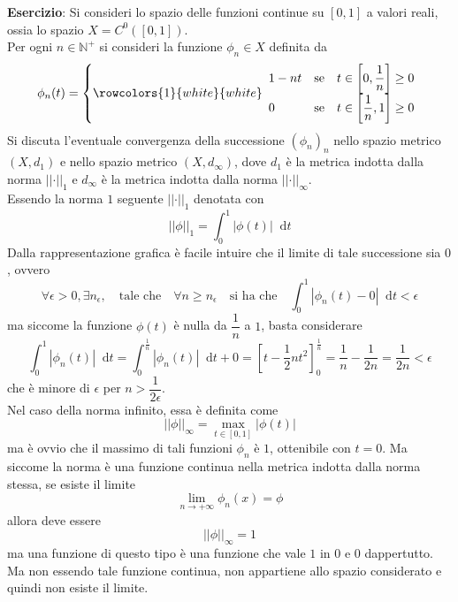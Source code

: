 \documentclass[a4paper]{extarticle}
\newcommand*\dif{\mathop{}\!\mathrm{d}}
\begin{document}
\vspace{2em}
\noindent
\textbf{Esercizio}: Si consideri lo spazio delle funzioni continue su $[0,1]$ a valori reali, ossia lo spazio $X=C^0([0,1])$.\\
Per ogni $n \in \mathbb{N}^+$ si consideri la funzione $\phi_n \in X$ definita da
\[
    \phi_n(t) = \left\{\rowcolors{1}{white}{white}    
    \begin{array}{lll}
        1-nt & \text{se} & t \in \left[0,\dfrac{1}{n}\right] \geq 0\\
        0   & \text{se} & t \in \left[\dfrac{1}{n},1\right] \geq 0\\
    \end{array}
    \right.
\]
Si discuta l'eventuale convergenza della successione $(\phi_n)_n$ nello spazio metrico $(X,d_1)$ e nello spazio metrico $(X,d_\infty)$, dove $d_1$ è la metrica indotta dalla norma $\left \vert \left \vert \cdot \right \vert \right \vert_1$ e $d_\infty$ è la metrica indotta dalla norma $\left \vert \left \vert \cdot \right \vert \right \vert_\infty$.\\
Essendo la norma $1$ seguente $\left \vert \left \vert \cdot \right \vert \right \vert_1$ denotata con
\[\left \vert \left \vert \phi \right \vert \right \vert_1 = \int_0^1 \left \vert \phi(t) \right \vert \dif t\]
Dalla rappresentazione grafica è facile intuire che il limite di tale successione sia $0$, ovvero
\[\forall \epsilon > 0, \exists n_\epsilon, \hspace{1em} \text{tale che} \hspace{1em} \forall n \geq n_\epsilon \hspace{1em} \text{si ha che} \hspace{1em} \int_0^1 \left \vert \phi_n(t) - 0\right \vert \dif t < \epsilon\]
ma siccome la funzione $\phi(t)$ è nulla da $\dfrac{1}{n}$ a $1$, basta considerare
\[\int_0^1 \left \vert \phi_n(t) \right \vert \dif t = \int_0^\frac{1}{n} \left \vert \phi_n(t) \right \vert \dif t + 0 = \left[t-\frac{1}{2}nt^2\right]_0^\frac{1}{n} = \frac{1}{n} - \frac{1}{2n} = \frac{1}{2n} < \epsilon\]
che è minore di $\epsilon$ per $n > \dfrac{1}{2 \epsilon}$.\\
Nel caso della norma infinito, essa è definita come
\[\vert \vert \phi \vert \vert_\infty = \underset{t \in [0,1]}{\max} \vert \phi(t) \vert\]
ma è ovvio che il massimo di tali funzioni $\phi_n$ è $1$, ottenibile con $t=0$. Ma siccome la norma è una funzione continua nella metrica indotta dalla norma stessa, se esiste il limite
\[\lim_{n \to +\infty} \phi_n(x) = \phi\]
allora deve essere
\[\vert \vert \phi \vert \vert_\infty = 1\]
ma una funzione di questo tipo è una funzione che vale $1$ in $0$ e $0$ dappertutto. Ma non essendo tale funzione continua, non appartiene allo spazio considerato e quindi non esiste il limite.
\end{document}
